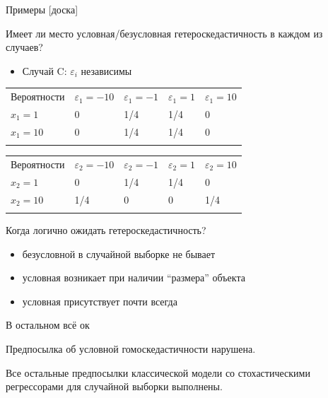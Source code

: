 \documentclass[ignorenonframetext,]{beamer}
\newcommand{\e}{\varepsilon}
\begin{document}
\begin{frame}{Примеры {[}доска{]}}

Имеет ли место условная/безусловная гетероскедастичность в каждом из
случаев?

\begin{itemize}
\itemsep1pt\parskip0pt
\item
  Случай C: $\e_i$ независимы
\end{itemize}

\begin{longtable}[c]{@{}lllll@{}}
\toprule\addlinespace
Вероятности & $\e_1=-10$ & $\e_1=-1$ & $\e_1=1$ & $\e_1=10$
\\\addlinespace
\midrule\endhead
$x_1=1$ & 0 & 1/4 & 1/4 & 0
\\\addlinespace
$x_1=10$ & 0 & 1/4 & 1/4 & 0
\\\addlinespace
\bottomrule
\end{longtable}

\begin{longtable}[c]{@{}lllll@{}}
\toprule\addlinespace
Вероятности & $\e_2=-10$ & $\e_2=-1$ & $\e_2=1$ & $\e_2=10$
\\\addlinespace
\midrule\endhead
$x_2=1$ & 0 & 1/4 & 1/4 & 0
\\\addlinespace
$x_2=10$ & 1/4 & 0 & 0 & 1/4
\\\addlinespace
\bottomrule
\end{longtable}

\end{frame}

\begin{frame}{Когда логично ожидать гетероскедастичность?}

\begin{itemize}
\item
  безусловной в случайной выборке не бывает
\item
  условная возникает при наличии ``размера'' объекта
\item
  условная присутствует почти всегда
\end{itemize}

\end{frame}

\begin{frame}{В остальном всё ок}

Предпосылка об условной гомоскедастичности нарушена.

Все остальные предпосылки классической модели со стохастическими
регрессорами для случайной выборки выполнены.

\end{frame}
\end{document}
